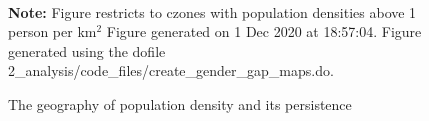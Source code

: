\begin{figure}[!h]
\centering
\caption{The geography of population density and its persistence}
\label{fig:map}
  \\ 
\par \begin{minipage}[h]{\textwidth}{\tiny\textbf{Note:} Figure restricts to czones with population densities above 1 person per km$^2$ Figure generated on  1 Dec 2020 at 18:57:04. Figure generated using the dofile 2\_analysis/code\_files/create\_gender\_gap\_maps.do.}\end{minipage}
\end{figure}
